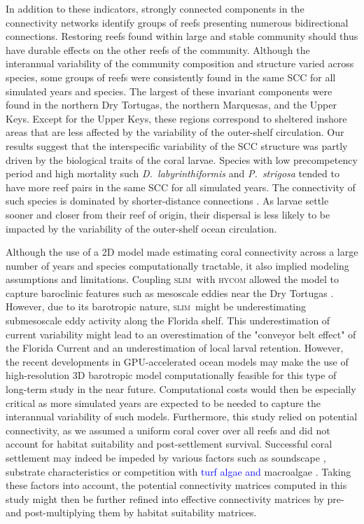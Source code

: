 \documentclass[preprint,12pt,authoryear]{elsarticle}
\newcommand{\modif}[1]{\textcolor{blue}{#1}}
\newcommand{\hycom}{\textsc{hycom} }
\newcommand{\slim}{\textsc{slim}\ }
\begin{document}
	In addition to these indicators, strongly connected components in the connectivity networks identify groups of reefs presenting numerous bidirectional connections. Restoring reefs found within large and stable community should thus have durable effects on the other reefs of the community. Although the interannual variability of the community composition and structure varied across species, some groups of reefs were consistently found in the same SCC for all simulated years and species. The largest of these invariant components were found in the northern Dry Tortugas, the northern Marquesas, and the Upper Keys. Except for the Upper Keys, these regions correspond to sheltered inshore areas that are less affected by the variability of the outer-shelf circulation. Our results suggest that the interspecific variability of the SCC structure was partly driven by the biological traits of the coral larvae. Species with low precompetency period and high mortality such \textit{D.~labyrinthiformis} and \textit{P.~strigosa} tended to have more reef pairs in the same SCC for all simulated years. The connectivity of such species is dominated by shorter-distance connections \citep{figueiredo2022global}. As larvae settle sooner and closer from their reef of origin, their dispersal is less likely to be impacted by the variability of the outer-shelf ocean circulation.
	
	
	Although the use of a 2D model made estimating coral connectivity across a large number of years and species computationally tractable, it also implied modeling assumptions and limitations. Coupling \slim with \hycom allowed the model to capture baroclinic features such as mesoscale eddies near the Dry Tortugas \citep{dobbelaere2022connecting}. However, due to its barotropic nature, \slim might be underestimating submesoscale eddy activity along the Florida shelf. This underestimation of current variability might lead to an overestimation of the "conveyor belt effect" of the Florida Current \citep{frys2020fine} and an underestimation of local larval retention. However, the recent developments in GPU-accelerated ocean models may make the use of high-resolution 3D barotropic model computationally feasible for this type of long-term study in the near future. Computational costs would then be especially critical as more simulated years are expected to be needed to capture the interannual variability of such models. Furthermore, this study relied on potential connectivity, as we assumed a uniform coral cover over all reefs and did not account for habitat suitability and post-settlement survival. Successful coral settlement may indeed be impeded by various factors such as soundscape \cite{lillis2016variation}, substrate characteristics \citep{jorissen2021coral} or competition with \modif{turf algae and} macroalgae \cite{webster2015macroalgae}. Taking these factors into account, the potential connectivity matrices computed in this study might then be further refined into effective connectivity matrices by pre- and post-multiplying them by habitat suitability matrices.
	
\end{document}
